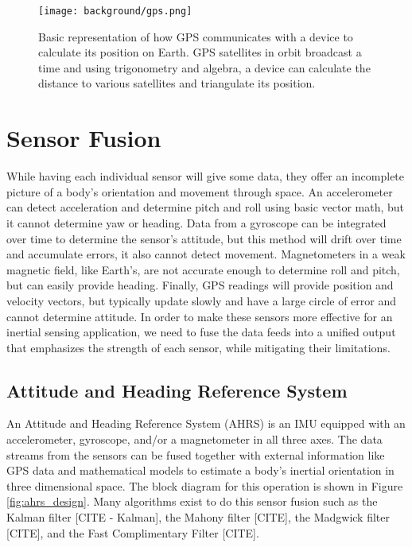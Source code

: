 \begin{figure}[h!]
    \caption[GPS diagram]{Basic representation of how GPS communicates with a device to calculate its position on Earth.
    GPS satellites in orbit broadcast a time and using trigonometry and algebra, a device can calculate the distance to various satellites and triangulate its position.}
    \label{fig:gps}
    \centering
    \texttt{[image: background/gps.png]}
\end{figure}

\section{Sensor Fusion} \label{sec:bkg_sensor_fusion}
While having each individual sensor will give some data, they offer an incomplete picture of a body's orientation and movement through space.
An accelerometer can detect acceleration and determine pitch and roll using basic vector math, but it cannot determine yaw or heading.
Data from a gyroscope can be integrated over time to determine the sensor's attitude, but this method will drift over time and accumulate errors, it also cannot detect movement.
Magnetometers in a weak magnetic field, like Earth's, are not accurate enough to determine roll and pitch, but can easily provide heading.
Finally, GPS readings will provide position and velocity vectors, but typically update slowly and have a large circle of error and cannot determine attitude.
In order to make these sensors more effective for an inertial sensing application, we need to fuse the data feeds into a unified output that emphasizes the strength of each sensor, while mitigating their limitations.

\subsection{Attitude and Heading Reference System} \label{ssec:bkg_ahrs}
An Attitude and Heading Reference System (AHRS) is an IMU equipped with an accelerometer, gyroscope, and/or a magnetometer in all three axes.
The data streams from the sensors can be fused together with external information like GPS data and mathematical models to estimate a body's inertial orientation in three dimensional space.
The block diagram for this operation is shown in Figure \ref{fig:ahrs_design}.
Many algorithms exist to do this sensor fusion such as the Kalman filter [CITE - Kalman], the Mahony filter [CITE], the Madgwick filter [CITE], and the Fast Complimentary Filter [CITE].

